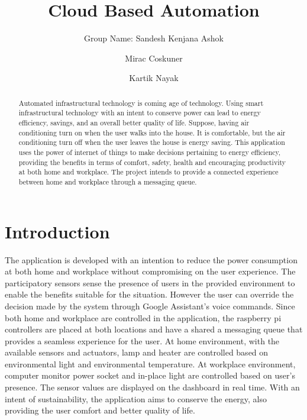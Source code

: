 \documentclass[runningheads]{llncs}
\begin{document}
%
\title{Cloud Based Automation}

\author{Group Name: Sandesh Kenjana Ashok \and
Mirac Coskuner \and
Kartik Nayak}

%
\maketitle              %
%
\begin{abstract}
Automated infrastructural technology is coming age of technology. Using smart infrastructural technology with an intent to conserve power can lead to energy efficiency, savings, and an overall better quality of life. Suppose, having air conditioning turn on when the user walks into the house. It is comfortable, but the air conditioning turn off when the user leaves the house is energy saving. This application uses the power of internet of things to make decisions pertaining to energy efficiency, providing the benefits in terms of comfort, safety, health and encouraging productivity at both home and workplace. The project intends to provide a connected experience between home and workplace through a messaging queue.


\end{abstract}
%
%
%
\section{Introduction}
The application is developed with an intention to reduce the power consumption at both home and workplace without compromising on the user experience. The participatory sensors sense the presence of users in the provided environment to enable the benefits suitable for the situation. However the user can override the decision made by the system through Google Assistant's voice commands. Since both home and workplace are controlled in the application, the raspberry pi controllers are placed at both locations and have a shared a messaging queue that provides a seamless experience for the user. At home environment, with the available sensors and actuators, lamp and heater are controlled based on  environmental light and environmental temperature. At workplace environment, computer monitor power socket and in-place light are controlled based on user's presence. The sensor values are displayed on the dashboard in real time. With an intent of sustainability, the application aims to conserve the energy, also providing the user comfort and better quality of life. 
\end{document}
